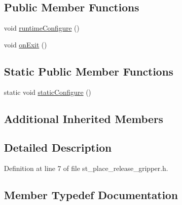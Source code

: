 \subsection*{Public Member Functions}
\begin{DoxyCompactItemize}
\item 
void \hyperlink{structsm__moveit__wine__serve_1_1StReleaseGripper_a48e920f5cb800410c4f7e68a0106d71d}{runtime\+Configure} ()
\item 
void \hyperlink{structsm__moveit__wine__serve_1_1StReleaseGripper_af1316527c0060146d68fe05ea64487b3}{on\+Exit} ()
\end{DoxyCompactItemize}
\subsection*{Static Public Member Functions}
\begin{DoxyCompactItemize}
\item 
static void \hyperlink{structsm__moveit__wine__serve_1_1StReleaseGripper_aeecac1480c4f0ccbff0a327012c9fb57}{static\+Configure} ()
\end{DoxyCompactItemize}
\subsection*{Additional Inherited Members}


\subsection{Detailed Description}


Definition at line 7 of file st\+\_\+place\+\_\+release\+\_\+gripper.\+h.



\subsection{Member Typedef Documentation}
\mbox{\label{structsm__moveit__wine__serve_1_1StReleaseGripper_a1507f23cfddea7bb85865c7f1027ac7b}} 
